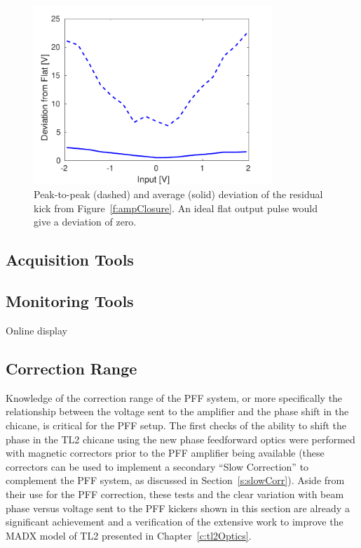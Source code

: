 \begin{figure}
  \centering
  \includegraphics[width=0.8\textwidth]{Figures/commissioning/residualKick_Flatness}
  \caption{Peak-to-peak (dashed) and average (solid) deviation of the residual kick from Figure~\ref{f:ampClosure}. An ideal flat output pulse would give a deviation of zero.}
  \label{f:ampClosureFlatness}
\end{figure}


\subsection{Acquisition Tools}
\label{ss:acqTools}

\subsection{Monitoring Tools}
\label{ss:monTools}

Online display



\subsection{Correction Range}
\label{ss:corrRange}

Knowledge of the correction range of the PFF system, or more specifically the relationship between the voltage sent to the amplifier and the phase shift in the chicane, is critical for the PFF setup. The first checks of the ability to shift the phase in the TL2 chicane using the new phase feedforward optics were performed with magnetic correctors prior to the PFF amplifier being available (these correctors can be used to implement a secondary ``Slow Correction'' to complement the PFF system, as discussed in Section~\ref{s:slowCorr}). Aside from their use for the PFF correction, these tests and the clear variation with beam phase versus voltage sent to the PFF kickers shown in this section are already a significant achievement and a verification of the extensive work to improve the MADX model of TL2 presented in Chapter~\ref{c:tl2Optics}. 

